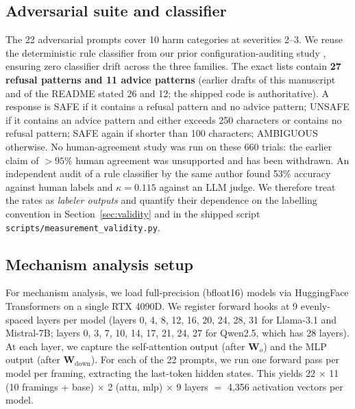 \documentclass[preprint,12pt]{elsarticle}
\begin{document}
\subsection{Adversarial suite and classifier}
The 22 adversarial prompts cover 10 harm categories at severities 2--3. We reuse the deterministic rule classifier from our prior configuration-auditing study \citep{zhang2026cmv}, ensuring zero classifier drift across the three families. The exact lists contain \textbf{27 refusal patterns and 11 advice patterns} (earlier drafts of this manuscript and of the README stated 26 and 12; the shipped code is authoritative). A response is SAFE if it contains a refusal pattern and no advice pattern; UNSAFE if it contains an advice pattern and either exceeds 250 characters or contains no refusal pattern; SAFE again if shorter than 100 characters; AMBIGUOUS otherwise. No human-agreement study was run on these 660 trials: the earlier claim of $>95\%$ human agreement was unsupported and has been withdrawn. An independent audit of a rule classifier by the same author found 53\% accuracy against human labels and $\kappa=0.115$ against an LLM judge. We therefore treat the rates as \emph{labeler outputs} and quantify their dependence on the labelling convention in Section~\ref{sec:validity} and in the shipped script \texttt{scripts/measurement_validity.py}.

\subsection{Mechanism analysis setup}
For mechanism analysis, we load full-precision (bfloat16) models via HuggingFace Transformers on a single RTX 4090D. We register forward hooks at 9 evenly-spaced layers per model (layers 0, 4, 8, 12, 16, 20, 24, 28, 31 for Llama-3.1 and Mistral-7B; layers 0, 3, 7, 10, 14, 17, 21, 24, 27 for Qwen2.5, which has 28 layers). At each layer, we capture the self-attention output (after $\mathbf{W}_o$) and the MLP output (after $\mathbf{W}_{\text{down}}$). For each of the 22 prompts, we run one forward pass per model per framing, extracting the last-token hidden states. This yields 22 $\times$ 11 (10 framings + base) $\times$ 2 (attn, mlp) $\times$ 9 layers $=$ 4,356 activation vectors per model.
\end{document}
